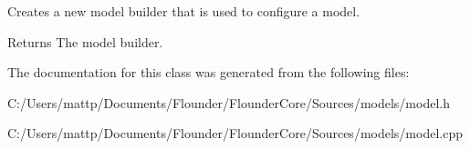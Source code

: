 Creates a new model builder that is used to configure a model. 

\begin{DoxyReturn}{Returns}
The model builder. 
\end{DoxyReturn}


The documentation for this class was generated from the following files\+:\begin{DoxyCompactItemize}
\item 
C\+:/\+Users/mattp/\+Documents/\+Flounder/\+Flounder\+Core/\+Sources/models/model.\+h\item 
C\+:/\+Users/mattp/\+Documents/\+Flounder/\+Flounder\+Core/\+Sources/models/model.\+cpp\end{DoxyCompactItemize}
